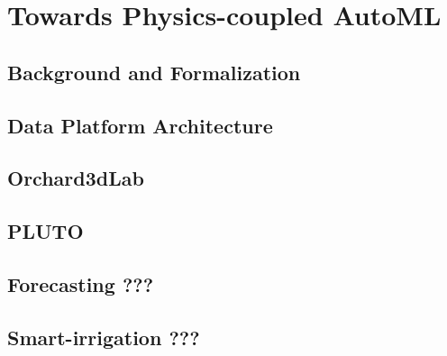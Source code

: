 \documentclass[a4paper,12pt,times,numbered,print,index]{Classes/PhDThesisPSnPDF}
\begin{document}
\part{Towards Physics-coupled AutoML}\label{part:farming}

\chapter{Background and Formalization}
\label{precision-chap:background}

\chapter{Data Platform Architecture}
\label{precision-chap:architecture}

\chapter{Orchard3dLab}
\label{precision-chap:orchard}

\chapter{PLUTO}
\label{precision-chap:pluto}

\chapter{Forecasting ???}
\label{precision-chap:forecasting}

\chapter{Smart-irrigation ???}
\label{precision-chap:smart-irrigation}

% 
% 
% 
% 
% 
\end{document}
